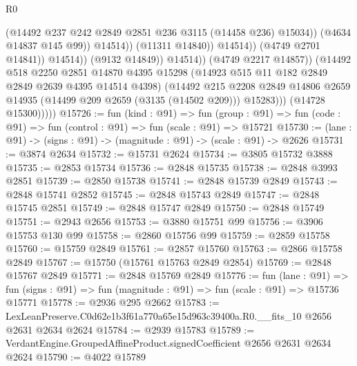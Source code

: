 \begin{lexlean}{R0}
\begin{coremodule}
                                          (@14492
                                            @237
                                            @242
                                            @2849
                                            @2851
                                            @236
                                            @3115
                                            (@14458 @236)
                                            @15034))
                                        (@4634 @14837 @145 @99))
                                      @14514))
                                  (@11311 @14840))
                                @14514))
                            (@4749 @2701 @14841))
                          @14514))
                      (@9132 @14849))
                    @14514))
                (@4749 @2217 @14857))
              (@14492
                @518
                @2250
                @2851
                @14870
                @4395
                @15298
                (@14923 @515 @11 @182 @2849 @2849 @2639 @4395 @14514 @4398)
                (@14492
                  @215
                  @2208
                  @2849
                  @14806
                  @2659
                  @14935
                  (@14499 @209 @2659 (@3135 (@14502 @209)))
                  @15283)))
            (@14728 @15300)))))
@15726 := fun (kind : @91) =>
  fun (group : @91) => fun (code : @91) => fun (control : @91) => fun (scale : @91) => @15721
@15730 := (lane : @91) -> (signs : @91) -> (magnitude : @91) -> (scale : @91) -> @2626
@15731 := @3874 @2634
@15732 := @15731 @2624
@15734 := @3805 @15732 @3888
@15735 := @2853 @15734
@15736 := @2848 @15735
@15738 := @2848 @3993 @2851
@15739 := @2850 @15738
@15741 := @2848 @15739 @2849
@15743 := @2848 @15741 @2852
@15745 := @2848 @15743 @2849
@15747 := @2848 @15745 @2851
@15749 := @2848 @15747 @2849
@15750 := @2848 @15749
@15751 := @2943 @2656
@15753 := @3880 @15751 @99
@15756 := @3906 @15753 @130 @99
@15758 := @2860 @15756 @99
@15759 := @2859 @15758
@15760 := @15759 @2849
@15761 := @2857 @15760
@15763 := @2866 @15758 @2849
@15767 := @15750 (@15761 @15763 @2849 @2854)
@15769 := @2848 @15767 @2849
@15771 := @2848 @15769 @2849
@15776 := fun (lane : @91) =>
  fun (signs : @91) => fun (magnitude : @91) => fun (scale : @91) => @15736 @15771
@15778 := @2936 @295 @2662
@15783 := LexLeanPreserve.C0d62e1b3f61a770a65e15d963c39400a.R0.__fits_10 @2656 @2631 @2634 @2624
@15784 := @2939 @15783
@15789 := VerdantEngine.GroupedAffineProduct.signedCoefficient @2656 @2631 @2634 @2624
@15790 := @4022 @15789

\end{coremodule}
\end{lexlean}
